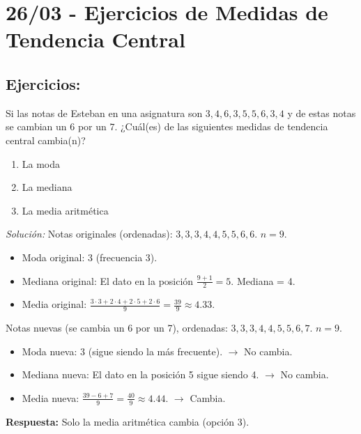\documentclass[12pt, letterpaper]{article}
\begin{document}
\newpage

\section{26/03 - Ejercicios de Medidas de Tendencia Central}
\subsection{Ejercicios:}

\noindent %
Si las notas de Esteban en una asignatura son \(3, 4, 6, 3, 5, 5, 6, 3, 4\) y de estas notas se cambian un $6$ por un $7$. ¿Cuál(es) de las siguientes medidas de tendencia central cambia(n)?
\begin{enumerate}
    \item La moda
    \item La mediana
    \item La media aritmética
\end{enumerate}
\textit{Solución:}
Notas originales (ordenadas): \(3, 3, 3, 4, 4, 5, 5, 6, 6\). $n=9$.
\begin{itemize}
    \item Moda original: 3 (frecuencia 3).
    \item Mediana original: El dato en la posición $\frac{9+1}{2}=5$. Mediana = 4.
    \item Media original: $\frac{3 \cdot 3 + 2 \cdot 4 + 2 \cdot 5 + 2 \cdot 6}{9} = \frac{39}{9} \approx 4.33$.
\end{itemize}
Notas nuevas (se cambia un 6 por un 7), ordenadas: \(3, 3, 3, 4, 4, 5, 5, 6, 7\). $n=9$.
\begin{itemize}
    \item Moda nueva: 3 (sigue siendo la más frecuente). $\rightarrow$ No cambia.
    \item Mediana nueva: El dato en la posición 5 sigue siendo 4. $\rightarrow$ No cambia.
    \item Media nueva: $\frac{39 - 6 + 7}{9} = \frac{40}{9} \approx 4.44$. $\rightarrow$ Cambia.
\end{itemize}
\textbf{Respuesta:} Solo la media aritmética cambia (opción 3).
\end{document}
